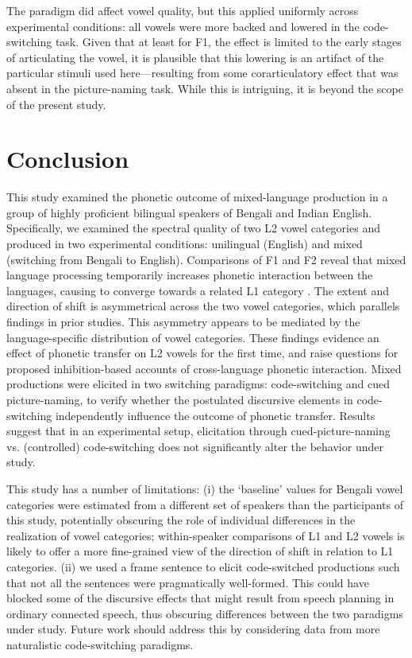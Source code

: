 \documentclass[12 pt]{article}
\newcommand{\nt}[1]{\textipa{[#1]}} %
\begin{document}
The paradigm did affect vowel quality, but this applied uniformly across experimental conditions: all vowels were more backed and lowered in the code-switching task. Given that at least for F1, the effect is limited to the early stages of articulating the vowel, it is plausible that this lowering is an artifact of the particular stimuli used here---resulting from some corarticulatory effect that was absent in the picture-naming task. While this is intriguing, it is beyond the scope of the present study.  \\


\section{Conclusion}
This study examined the phonetic outcome of mixed-language production in a group of highly proficient bilingual speakers of Bengali and Indian English. Specifically, we examined the spectral quality of two L2 vowel categories \nt{2} and \nt{\ae} produced in two experimental conditions: unilingual (English) and mixed (switching from Bengali to English).
Comparisons of F1 and F2 reveal that mixed language processing temporarily increases phonetic interaction between the languages, causing \nt{2} to converge towards a related L1 category \nt{a:}. The extent and direction of shift is asymmetrical across the two vowel categories, which parallels findings in prior studies. This asymmetry appears to be mediated by the language-specific distribution of vowel categories. These findings evidence an effect of phonetic transfer on L2 vowels for the first time, and raise questions for proposed inhibition-based accounts of cross-language phonetic interaction. Mixed productions were elicited in two switching paradigms: code-switching and cued picture-naming, to verify whether the postulated discursive elements in code-switching independently influence the outcome of phonetic transfer. Results suggest that in an experimental setup, elicitation through cued-picture-naming vs. (controlled) code-switching does not significantly alter the behavior under study. 

This study has a number of limitations: (i) the `baseline' values for Bengali vowel categories were estimated from a different set of speakers than the participants of this study, potentially obscuring the role of individual differences in the realization of vowel categories; within-speaker comparisons of L1 and L2 vowels is likely to offer a more fine-grained view of the direction of shift in relation to L1 categories.  (ii) we used a frame sentence to elicit code-switched productions such that not all the sentences were pragmatically well-formed. This could have blocked some of the discursive effects that might result from speech planning in ordinary connected speech, thus obscuring differences between the two paradigms under study. Future work should address this by considering data from more naturalistic code-switching paradigms.     
\end{document}
